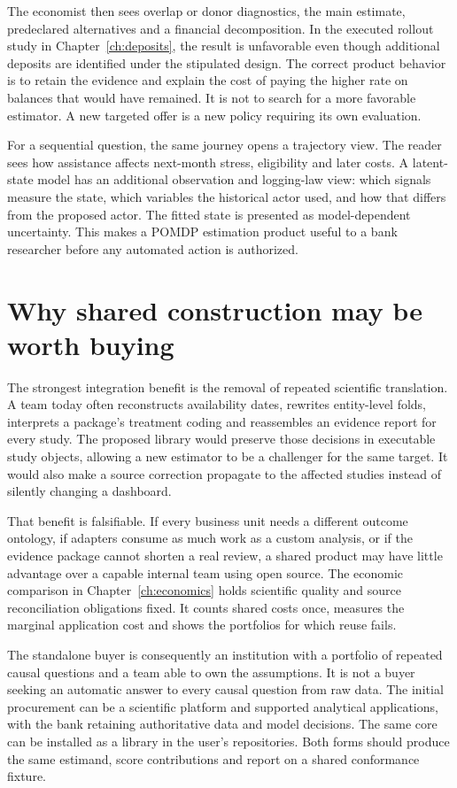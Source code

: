 The economist then sees overlap or donor diagnostics, the main estimate,
predeclared alternatives and a financial decomposition. In the executed
rollout study in Chapter~\ref{ch:deposits}, the result is unfavorable even
though additional deposits are identified under the stipulated design.
The correct product behavior is to retain the evidence and explain the cost
of paying the higher rate on balances that would have remained. It is not
to search for a more favorable estimator. A new targeted offer is a new
policy requiring its own evaluation.

For a sequential question, the same journey opens a trajectory view. The
reader sees how assistance affects next-month stress, eligibility and later
costs. A latent-state model has an additional observation and logging-law
view: which signals measure the state, which variables the historical actor
used, and how that differs from the proposed actor. The fitted state is
presented as model-dependent uncertainty. This makes a POMDP estimation
product useful to a bank researcher before any automated action is authorized.

\section{Why shared construction may be worth buying}
The strongest integration benefit is the removal of repeated scientific
translation. A team today often reconstructs availability dates, rewrites
entity-level folds, interprets a package's treatment coding and reassembles
an evidence report for every study. The proposed library would preserve those
decisions in executable study objects, allowing a new estimator to be a
challenger for the same target. It would also make a source correction
propagate to the affected studies instead of silently changing a dashboard.

That benefit is falsifiable. If every business unit needs a different outcome
ontology, if adapters consume as much work as a custom analysis, or if the
evidence package cannot shorten a real review, a shared product may have
little advantage over a capable internal team using open source. The economic
comparison in Chapter~\ref{ch:economics} holds scientific quality and source
reconciliation obligations fixed. It counts shared costs once, measures the
marginal application cost and shows the portfolios for which reuse fails.

The standalone buyer is consequently an institution with a portfolio of
repeated causal questions and a team able to own the assumptions. It is not
a buyer seeking an automatic answer to every causal question from raw data.
The initial procurement can be a scientific platform and supported analytical
applications, with the bank retaining authoritative data and model decisions.
The same core can be installed as a library in the user's repositories.
Both forms should produce the same estimand, score contributions and report
on a shared conformance fixture.

